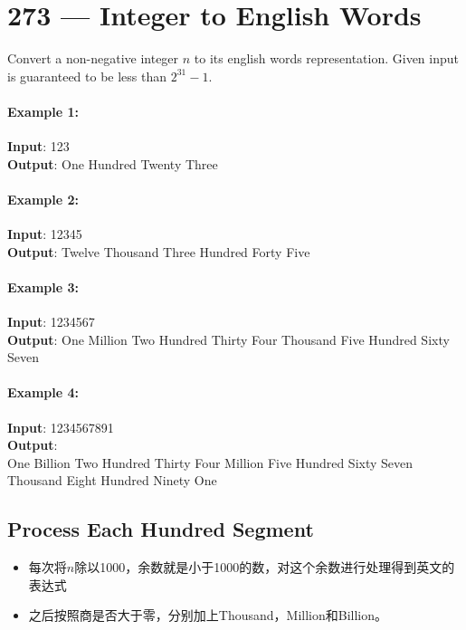 \section{273 --- Integer to English Words}
Convert a non-negative integer $n$ to its english words representation. Given input is guaranteed to be less than $2^{31} - 1$.

\paragraph{Example 1:}

\begin{flushleft}
\textbf{Input}: 123
\\
\textbf{Output}: One Hundred Twenty Three
\end{flushleft}

\paragraph{Example 2:}

\begin{flushleft}
\textbf{Input}: 12345
\\
\textbf{Output}: Twelve Thousand Three Hundred Forty Five
\end{flushleft}

\paragraph{Example 3:}

\begin{flushleft}
\textbf{Input}: 1234567
\\
\textbf{Output}: One Million Two Hundred Thirty Four Thousand Five Hundred Sixty Seven
\end{flushleft}

\paragraph{Example 4:}

\begin{flushleft}
\textbf{Input}: 1234567891
\\
\textbf{Output}:
\\
One Billion Two Hundred Thirty Four Million Five Hundred Sixty Seven Thousand Eight Hundred Ninety One
\end{flushleft}
\subsection{Process Each Hundred Segment}
\begin{itemize}
\item 每次将$n$除以1000，余数就是小于1000的数，对这个余数进行处理得到英文的表达式
\item 之后按照商是否大于零，分别加上Thousand，Million和Billion。
\end{itemize}


